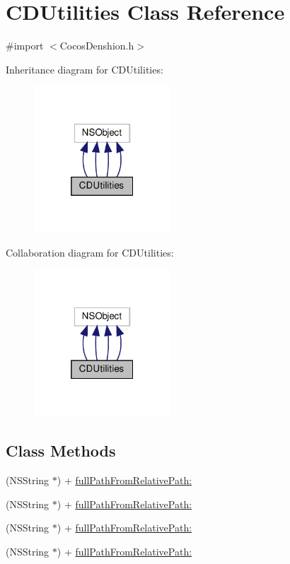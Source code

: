 \hypertarget{interfaceCDUtilities}{}\section{C\+D\+Utilities Class Reference}
\label{interfaceCDUtilities}


{\ttfamily \#import $<$Cocos\+Denshion.\+h$>$}



Inheritance diagram for C\+D\+Utilities\+:
\nopagebreak
\begin{figure}[H]
\begin{center}
\leavevmode
\includegraphics[width=145pt]{interfaceCDUtilities__inherit__graph}
\end{center}
\end{figure}


Collaboration diagram for C\+D\+Utilities\+:
\nopagebreak
\begin{figure}[H]
\begin{center}
\leavevmode
\includegraphics[width=145pt]{interfaceCDUtilities__coll__graph}
\end{center}
\end{figure}
\subsection*{Class Methods}
\begin{DoxyCompactItemize}
\item 
(N\+S\+String $\ast$) + \hyperlink{interfaceCDUtilities_a0b870cdbce4ca5a7f13a992034d668d6}{full\+Path\+From\+Relative\+Path\+:}
\item 
(N\+S\+String $\ast$) + \hyperlink{interfaceCDUtilities_a1b7fe6a2b7074ed0e031ec420e172862}{full\+Path\+From\+Relative\+Path\+:}
\item 
(N\+S\+String $\ast$) + \hyperlink{interfaceCDUtilities_a1b7fe6a2b7074ed0e031ec420e172862}{full\+Path\+From\+Relative\+Path\+:}
\item 
(N\+S\+String $\ast$) + \hyperlink{interfaceCDUtilities_a1b7fe6a2b7074ed0e031ec420e172862}{full\+Path\+From\+Relative\+Path\+:}
\end{DoxyCompactItemize}


